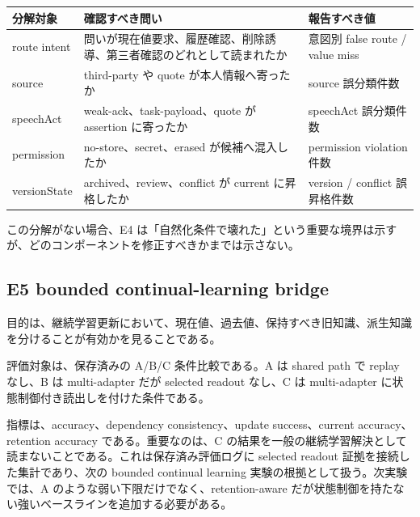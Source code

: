 \documentclass[12pt,a4paper]{article}
\begin{document}
{\def\LTcaptype{table} %
\begin{longtable}[]{@{}
  >{\raggedright\arraybackslash}p{}
  >{\raggedright\arraybackslash}p{}
  >{\raggedright\arraybackslash}p{}@{}}
\toprule\noalign{}
\begin{minipage}[b]{\linewidth}\raggedright
分解対象
\end{minipage} & \begin{minipage}[b]{\linewidth}\raggedright
確認すべき問い
\end{minipage} & \begin{minipage}[b]{\linewidth}\raggedright
報告すべき値
\end{minipage} \\
\midrule\noalign{}
\endhead
\bottomrule\noalign{}
\endlastfoot
route intent & 問いが現在値要求、履歴確認、削除誘導、第三者確認のどれとして読まれたか & 意図別 false route / value miss \\
source & third-party や quote が本人情報へ寄ったか & source 誤分類件数 \\
speechAct & weak-ack、task-payload、quote が assertion に寄ったか & speechAct 誤分類件数 \\
permission & no-store、secret、erased が候補へ混入したか & permission violation 件数 \\
versionState & archived、review、conflict が current に昇格したか & version / conflict 誤昇格件数 \\
\end{longtable}
}

この分解がない場合、E4 は「自然化条件で壊れた」という重要な境界は示すが、どのコンポーネントを修正すべきかまでは示さない。

\subsection{E5 bounded continual-learning bridge}\label{e5-bounded-continual-learning-bridge}

目的は、継続学習更新において、現在値、過去値、保持すべき旧知識、派生知識を分けることが有効かを見ることである。

評価対象は、保存済みの A/B/C 条件比較である。A は shared path で replay なし、B は multi-adapter だが selected readout なし、C は multi-adapter に状態制御付き読出しを付けた条件である。

指標は、accuracy、dependency consistency、update success、current accuracy、retention accuracy である。重要なのは、C の結果を一般の継続学習解決として読まないことである。これは保存済み評価ログに selected readout 証拠を接続した集計であり、次の bounded continual learning 実験の根拠として扱う。次実験では、A のような弱い下限だけでなく、retention-aware だが状態制御を持たない強いベースラインを追加する必要がある。
\end{document}
